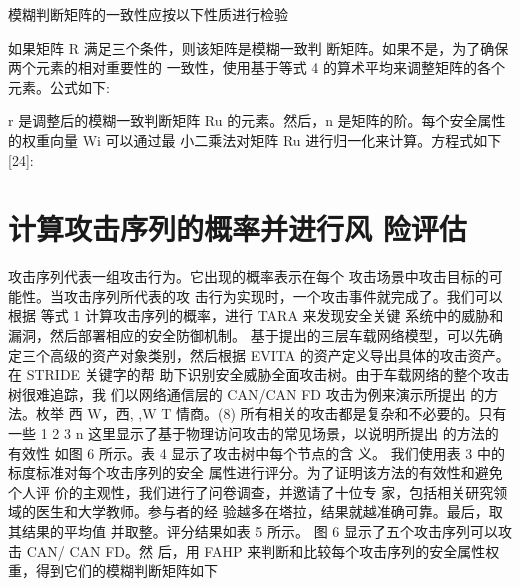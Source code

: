 模糊判断矩阵的一致性应按以下性质进行检验

如果矩阵 R 满足三个条件，则该矩阵是模糊一致判
断矩阵。如果不是，为了确保两个元素的相对重要性的
一致性，使用基于等式 4 的算术平均来调整矩阵的各个
元素。公式如下:

r 是调整后的模糊一致判断矩阵 Ru 的元素。然后，n
是矩阵的阶。每个安全属性的权重向量 Wi 可以通过最
小二乘法对矩阵 Ru 进行归一化来计算。方程式如下
[24]:
\section{计算攻击序列的概率并进行风
险评估}

攻击序列代表一组攻击行为。它出现的概率表示在每个
攻击场景中攻击目标的可能性。当攻击序列所代表的攻
击行为实现时，一个攻击事件就完成了。我们可以根据
等式 1 计算攻击序列的概率，进行 TARA 来发现安全关键
系统中的威胁和漏洞，然后部署相应的安全防御机制。
\newline
基于提出的三层车载网络模型，可以先确定三个高级的资产对象类别，然后根据 EVITA
的资产定义导出具体的攻击资产。在 STRIDE 关键字的帮
助下识别安全威胁全面攻击树。由于车载网络的整个攻击树很难追踪，我
们以网络通信层的 CAN/CAN FD 攻击为例来演示所提出
的方法。枚举 西 W，西, ,W T 情商。(8)
所有相关的攻击都是复杂和不必要的。只有一些
1 2 3 n
这里显示了基于物理访问攻击的常见场景，以说明所提出
的方法的有效性
如图 6 所示。表 4 显示了攻击树中每个节点的含
义。
我们使用表 3 中的标度标准对每个攻击序列的安全
属性进行评分。为了证明该方法的有效性和避免个人评
价的主观性，我们进行了问卷调查，并邀请了十位专
家，包括相关研究领域的医生和大学教师。参与者的经
验越多在塔拉，结果就越准确可靠。最后，取其结果的平均值
并取整。评分结果如表 5 所示。
图 6 显示了五个攻击序列可以攻击 CAN/ CAN FD。然
后，用 FAHP 来判断和比较每个攻击序列的安全属性权
重，得到它们的模糊判断矩阵如下